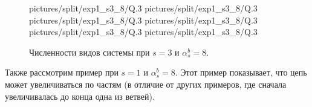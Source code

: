 \begin{figure}[H]
    \centering
       {pictures/split/exp1_s3_8/Q}{.3}
      {pictures/split/exp1_s3_8/Q}{.3}
      {pictures/split/exp1_s3_8/Q}{.3}
      {pictures/split/exp1_s3_8/Q}{.3}
      {pictures/split/exp1_s3_8/Q}{.3}
     {pictures/split/exp1_s3_8/Q}{.3}
\caption{Численности видов системы при \(s=3\) и \(\alpha^b_s = 8\).}  \label{fig:split_exp1_s3_8}
\end{figure}

Также рассмотрим пример при \(s=1\) и \(\alpha^b_s = 8\). Этот пример показывает, что цепь может увеличиваться по частям (в отличие от других примеров, где сначала увеличивалась до конца одна из ветвей). 
